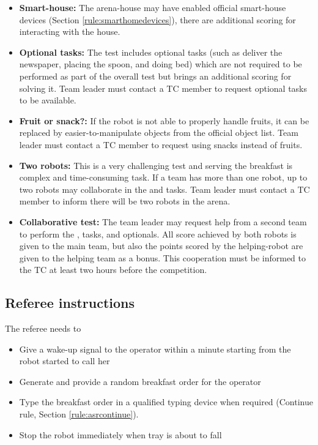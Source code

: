 \begin{itemize}
\item \textbf{Smart-house:} The arena-house may have enabled official smart-house devices (Section \ref{rule:smarthomedevices}), there are additional scoring for interacting with the house.

\item \textbf{Optional tasks:} The test includes optional tasks (such as deliver the newspaper, placing the spoon, and doing bed) which are not required to be performed as part of the overall test but brings an additional scoring for solving it. Team leader must contact a TC member to request optional tasks to be available.

\item \textbf{Fruit or snack?:} If the robot is not able to properly handle fruits, it can be replaced by easier-to-manipulate objects from the official object list. Team leader must contact a TC member to request using snacks instead of fruits.

\item \textbf{Two robots:} This is a very challenging test and serving the breakfast is complex and time-consuming task. If a team has more than one robot, up to two robots may collaborate in the  and  tasks. Team leader must contact a TC member to inform there will be two robots in the arena.

\item \textbf{Collaborative test:} The team leader may request help from a second team to perform the ,  tasks, and  optionals. All score achieved by both robots is given to the main team, but also the points scored by the helping-robot are given to the helping team as a bonus. This cooperation must be informed to the TC at least two hours before the competition.
\end{itemize}

\subsection{Referee instructions}

The referee needs to
\begin{itemize}
\item Give a wake-up signal to the operator within a minute starting from the robot started to call her
\item Generate and provide a random breakfast order for the operator
\item Type the breakfast order in a qualified typing device when required (Continue rule, Section \ref{rule:asrcontinue}).
\item Stop the robot immediately when tray is about to fall
\end{itemize}

